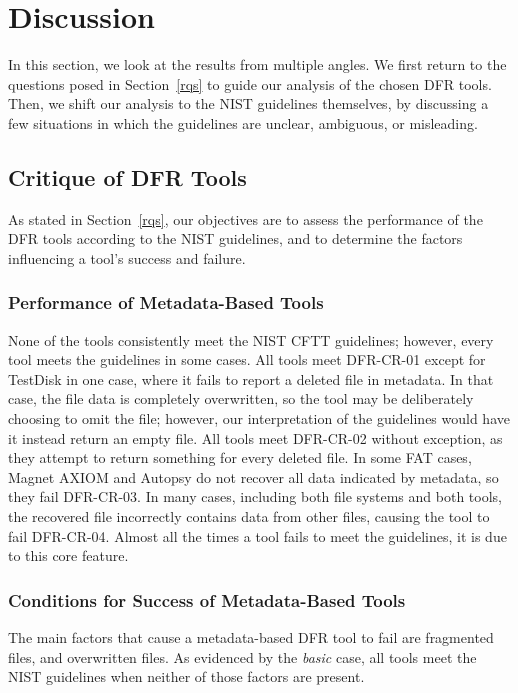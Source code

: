 \section{Discussion}
In this section, we look at the results from multiple angles. 
We first return to the questions posed in Section~\ref{rqs} to guide our analysis of the chosen DFR tools.
Then, we shift our analysis to the NIST guidelines themselves, by discussing a few situations in which the guidelines are unclear, ambiguous, or misleading.

\subsection{Critique of DFR Tools}
As stated in Section~\ref{rqs}, our objectives are to assess the performance of the DFR tools according to the NIST guidelines, and to determine the factors influencing a tool's success and failure. 

\subsubsection{Performance of Metadata-Based Tools}

None of the tools consistently meet the NIST CFTT guidelines; however, every tool meets the guidelines in some cases.
All tools meet DFR-CR-01 except for TestDisk in one case, where it fails to report a deleted file in metadata.
In that case, the file data is completely overwritten, so the tool may be deliberately choosing to omit the file; however, our interpretation of the guidelines would have it instead return an empty file.
All tools meet DFR-CR-02 without exception, as they attempt to return something for every deleted file.
In some FAT cases, Magnet AXIOM and Autopsy do not recover all data indicated by metadata, so they fail DFR-CR-03.
In many cases, including both file systems and both tools, the recovered file incorrectly contains data from other files, causing the tool to fail DFR-CR-04.
Almost all the times a tool fails to meet the guidelines, it is due to this core feature.


\subsubsection{Conditions for Success of Metadata-Based Tools}

The main factors that cause a metadata-based DFR tool to fail are fragmented files, and overwritten files.
As evidenced by the \emph{basic} case, all tools meet the NIST guidelines when neither of those factors are present.

